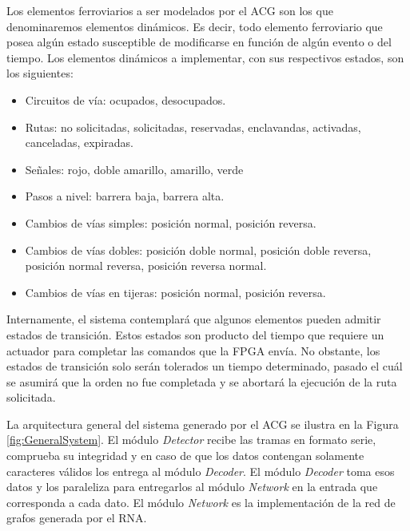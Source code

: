 	Los elementos ferroviarios a ser modelados por el ACG son los que denominaremos elementos dinámicos. Es decir, todo elemento ferroviario que posea algún estado susceptible de modificarse en función de algún evento o del tiempo. Los elementos dinámicos a implementar, con sus respectivos estados, son los siguientes:
	
	\begin{itemize}
		\item Circuitos de vía: ocupados, desocupados.
		\item Rutas: no solicitadas, solicitadas, reservadas, enclavandas, activadas, canceladas, expiradas.
		\item Señales: rojo, doble amarillo, amarillo, verde
		\item Pasos a nivel: barrera baja, barrera alta.
		\item Cambios de vías simples: posición normal, posición reversa.
		\item Cambios de vías dobles: posición doble normal, posición doble reversa, posición normal reversa, posición reversa normal.
		\item Cambios de vías en tijeras: posición normal, posición reversa.
	\end{itemize}
	
	Internamente, el sistema contemplará que algunos elementos pueden admitir estados de transición. Estos estados son producto del tiempo que requiere un actuador para completar las comandos que la FPGA envía. No obstante, los estados de transición solo serán tolerados un tiempo determinado, pasado el cuál se asumirá que la orden no fue completada y se abortará la ejecución de la ruta solicitada.
	
	La arquitectura general del sistema generado por el ACG se ilustra en la Figura \ref{fig:GeneralSystem}. El módulo \textit{Detector} recibe las tramas en formato serie, comprueba su integridad y en caso de que los datos contengan solamente caracteres válidos los entrega al módulo \textit{Decoder}. El módulo \textit{Decoder} toma esos datos y los paraleliza para entregarlos al módulo \textit{Network} en la entrada que corresponda a cada dato. El módulo \textit{Network} es la implementación de la red de grafos generada por el RNA. 
	
